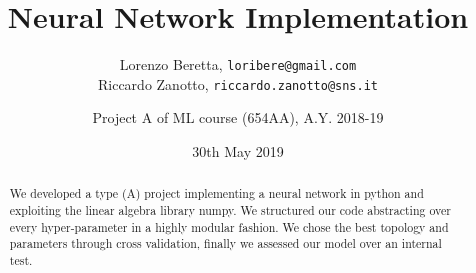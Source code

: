 \documentclass[12pt]{article}
\title{Neural Network Implementation}
\author{Lorenzo Beretta, \texttt{loribere@gmail.com}\\
  Riccardo Zanotto, \texttt{riccardo.zanotto@sns.it}
  \and Project A of ML course (654AA), A.Y. 2018-19}
\date{30th May 2019}
\begin{document}
\maketitle

\begin{abstract}
  We developed a type (A) project implementing a neural network in python and exploiting the linear algebra library numpy. We structured our code abstracting over every hyper-parameter in a highly modular fashion. We chose the best topology and parameters through cross validation, finally we assessed our model over an internal test.  
\end{abstract}






\end{document}
